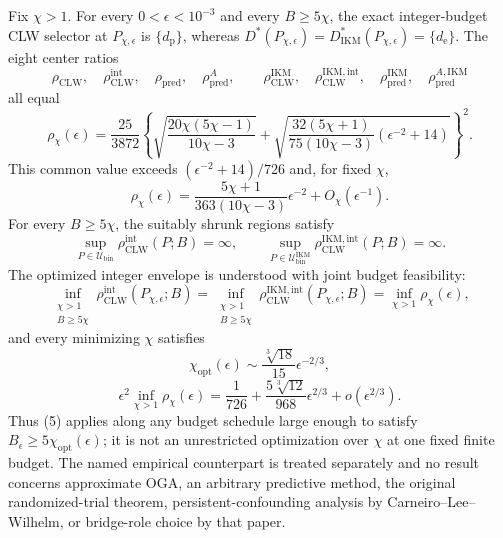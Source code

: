 Fix \(\chi>1\).  For every \(0<\epsilon<10^{-3}\) and every \(B\ge5\chi\), the exact integer-budget CLW selector at \(P_{\chi,\epsilon}\) is \(\{d_{\mathrm p}\}\), whereas \(D^*(P_{\chi,\epsilon})=D_{\mathrm{IKM}}^*(P_{\chi,\epsilon})=\{d_{\mathrm e}\}\).  The eight center ratios
\[
 \rho_{\mathrm{CLW}},\quad
 \rho_{\mathrm{CLW}}^{\mathrm{int}},\quad
 \rho_{\mathrm{pred}},\quad
 \rho_{\mathrm{pred}}^A,
 \qquad
 \rho_{\mathrm{CLW}}^{\mathrm{IKM}},\quad
 \rho_{\mathrm{CLW}}^{\mathrm{IKM,int}},\quad
 \rho_{\mathrm{pred}}^{\mathrm{IKM}},\quad
 \rho_{\mathrm{pred}}^{A,\mathrm{IKM}}
\]
all equal
\[
 \rho_\chi(\epsilon)=\frac{25}{3872}
 \left\{
 \sqrt{\frac{20\chi(5\chi-1)}{10\chi-3}}
 +\sqrt{\frac{32(5\chi+1)}{75(10\chi-3)}
 (\epsilon^{-2}+14)}
 \right\}^{2}.                                             \tag{1}
\]
This common value exceeds \((\epsilon^{-2}+14)/726\) and, for fixed \(\chi\),
\[
 \rho_\chi(\epsilon)=
 \frac{5\chi+1}{363(10\chi-3)}\epsilon^{-2}
 +O_\chi(\epsilon^{-1}).                                  \tag{2}
\]
For every \(B\ge5\chi\), the suitably shrunk regions satisfy
\[
 \sup_{P\in\mathcal U_{\mathrm{bin}}}
 \rho_{\mathrm{CLW}}^{\mathrm{int}}(P;B)=\infty,
 \qquad
 \sup_{P\in\mathcal U_{\mathrm{bin}}^{\mathrm{IKM}}}
 \rho_{\mathrm{CLW}}^{\mathrm{IKM,int}}(P;B)=\infty.      \tag{3}
\]
The optimized integer envelope is understood with joint budget feasibility:
\[
 \inf_{\substack{\chi>1\\ B\ge5\chi}}
 \rho_{\mathrm{CLW}}^{\mathrm{int}}(P_{\chi,\epsilon};B)
 =\inf_{\substack{\chi>1\\ B\ge5\chi}}
 \rho_{\mathrm{CLW}}^{\mathrm{IKM,int}}(P_{\chi,\epsilon};B)
 =\inf_{\chi>1}\rho_\chi(\epsilon),                     \tag{4}
\]
and every minimizing \(\chi\) satisfies
\[
 \chi_{\mathrm{opt}}(\epsilon)
 \sim\frac{\sqrt[3]{18}}{15}\epsilon^{-2/3},
\]
\[
 \epsilon^2\inf_{\chi>1}\rho_\chi(\epsilon)
 =\frac1{726}+\frac{5\sqrt[3]{12}}{968}\epsilon^{2/3}
 +o(\epsilon^{2/3}).                                      \tag{5}
\]
Thus (5) applies along any budget schedule large enough to satisfy \(B_\epsilon\ge5\chi_{\mathrm{opt}}(\epsilon)\); it is not an unrestricted optimization over \(\chi\) at one fixed finite budget.  The named empirical counterpart is treated separately and no result concerns approximate OGA, an arbitrary predictive method, the original randomized-trial theorem, persistent-confounding analysis by Carneiro--Lee--Wilhelm, or bridge-role choice by that paper.